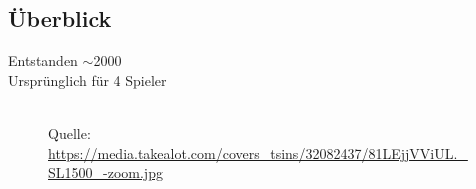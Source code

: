 \documentclass[12pt]{beamer}
\begin{document}
\subsection{Überblick}
\begin{frame}
	Entstanden $\sim$2000\\
	Ursprünglich für 4 Spieler
    \begin{figure}[tp]
        \centering
        \\
        \tiny Quelle: \url{https://media.takealot.com/covers\_tsins/32082437/81LEjjVViUL.\_SL1500\_-zoom.jpg}
    \end{figure}
\end{frame}
\end{document}
